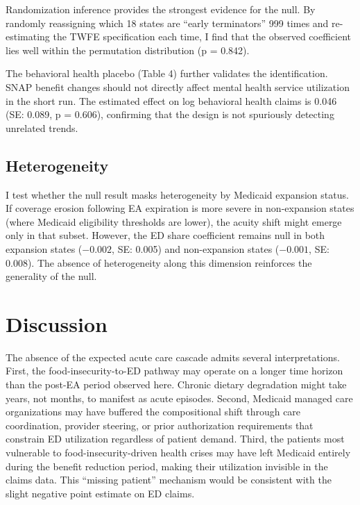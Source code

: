 \documentclass[12pt]{article}
\begin{document}
Randomization inference provides the strongest evidence for the null. By randomly reassigning which 18 states are ``early terminators'' 999 times and re-estimating the TWFE specification each time, I find that the observed coefficient lies well within the permutation distribution (p = 0.842).



The behavioral health placebo (Table 4) further validates the identification. SNAP benefit changes should not directly affect mental health service utilization in the short run. The estimated effect on log behavioral health claims is 0.046 (SE: 0.089, p = 0.606), confirming that the design is not spuriously detecting unrelated trends.

\subsection{Heterogeneity}

I test whether the null result masks heterogeneity by Medicaid expansion status. If coverage erosion following EA expiration is more severe in non-expansion states (where Medicaid eligibility thresholds are lower), the acuity shift might emerge only in that subset. However, the ED share coefficient remains null in both expansion states ($-0.002$, SE: 0.005) and non-expansion states ($-0.001$, SE: 0.008). The absence of heterogeneity along this dimension reinforces the generality of the null.

\section{Discussion}

The absence of the expected acute care cascade admits several interpretations. First, the food-insecurity-to-ED pathway may operate on a longer time horizon than the post-EA period observed here. Chronic dietary degradation might take years, not months, to manifest as acute episodes. Second, Medicaid managed care organizations may have buffered the compositional shift through care coordination, provider steering, or prior authorization requirements that constrain ED utilization regardless of patient demand. Third, the patients most vulnerable to food-insecurity-driven health crises may have left Medicaid entirely during the benefit reduction period, making their utilization invisible in the claims data. This ``missing patient'' mechanism would be consistent with the slight negative point estimate on ED claims.
\end{document}
